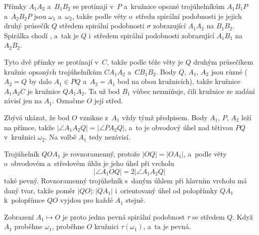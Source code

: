 %
{
    Přímky $A_1A_2$ a~$B_1B_2$ se protínají v~$P$ a~kružnice opsané trojúhelníkům $A_1B_1P$ a~$A_2B_2P$ jsou $\omega_1$ a~$\omega_2$, takže podle věty o~středu spirální podobnosti je jejich druhý průsečík $Q$ středem spirální podobnosti $\sigma$ zobrazující $A_1A_2$ na $B_1B_2$. Spirálka chodí , a~tak je $Q$ i~středem spirální podobnosti zobrazující $A_1B_1$ na $A_2B_2$.

    Tyto dvě přímky se protínají v~$C$, takže podle téže věty je $Q$ druhým průsečíkem kružnic opsaných trojúhelníkům $CA_1A_2$ a~$CB_1B_2$. Body $Q$, $A_1$, $A_2$ jsou různé ($A_2 = Q$ by dalo $A_1 \in PQ$ a~$A_2 = A_1$ bod na obou kružnicích), takže kružnice $A_1A_2C$ je kružnice $QA_1A_2$. Ta už bod $B_1$ vůbec nezmiňuje, čili kružnice ze zadání závisí jen na $A_1$. Označme $O$ její střed.


    Zbývá ukázat, že bod $O$ vznikne z~$A_1$ vždy týmž předpisem. Body $A_1$, $P$, $A_2$ leží na přímce, takže $|\angle A_1A_2Q| = |\angle PA_2Q|$, a~to je obvodový úhel nad tětivou $PQ$ v~kružnici $\omega_2$. Na volbě $A_1$ tedy nezávisí.

    Trojúhelník $QOA_1$ je rovnoramenný, protože $|OQ| = |OA_1|$, a~podle věty o~obvodovém a~středovém úhlu je jeho úhel při vrcholu
    $$
    |\angle A_1OQ| = 2|\angle A_1A_2Q|
    $$
    také pevný. Rovnoramenný trojúhelník s~daným úhlem při hlavním vrcholu má daný tvar, takže poměr $|QO| : |QA_1|$ i~orientovaný úhel od polopřímky $QA_1$ k~polopřímce $QO$ vyjdou pro každé $A_1$ stejně.

    Zobrazení $A_1 \mapsto O$ je proto jedna pevná spirální podobnost $\tau$ se středem $Q$. Když $A_1$ proběhne $\omega_1$, proběhne $O$ kružnici $\tau(\omega_1)$, a~ta je pevná.
}

